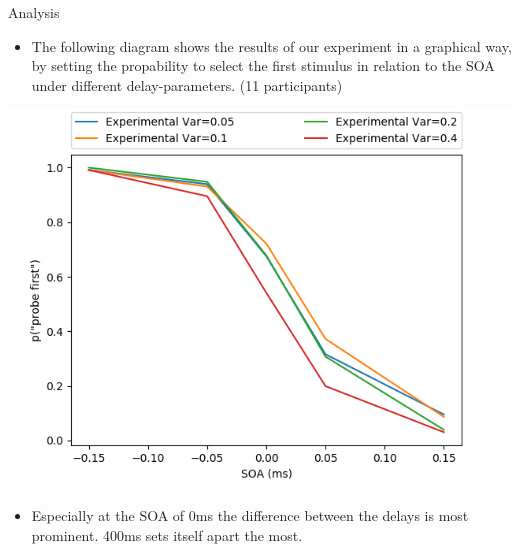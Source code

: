 \documentclass[a0paper,portrait]{baposter}
\begin{document}
\begin{poster}
		\begin{posterbox}[name=results,span=1,column=2,row=0]{Analysis}
			\begin{itemize}
				\item The following diagram shows the results of our experiment in a graphical way, by setting the propability to select the first stimulus in relation to the SOA under different delay-parameters. (11 participants)
			\end{itemize}
			\begin{center}
				\includegraphics[width=\textwidth]{imgs/complete_data.png}
			\end{center}
			\begin{itemize}
				\item Especially at the SOA of 0ms the difference between the delays is most prominent. 400ms sets itself apart the most.
			\end{itemize}
			

\end{posterbox}
\end{poster}
\end{document}
